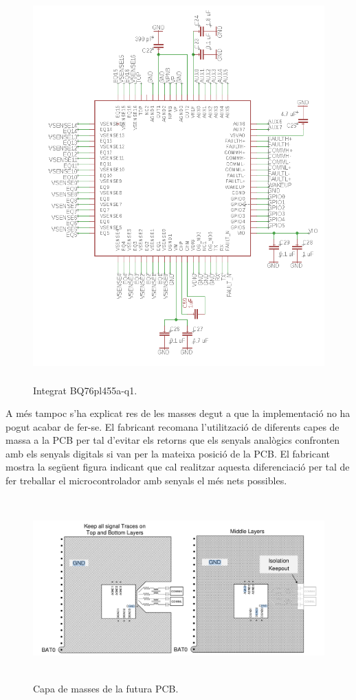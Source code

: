 \begin{figure}[H]
	\centering
    \includegraphics[width=\textwidth, height=15cm] {Prototip/schbq.png}
    \caption{Integrat BQ76pl455a-q1.}
\end{figure}

\newpage 

A més tampoc s'ha explicat res de les masses degut a que la implementació no ha pogut acabar de fer-se. El fabricant recomana l'utilització de diferents capes de massa a la PCB per tal d'evitar els retorns que els senyals analògics confronten amb els senyals digitals si van per la mateixa posició de la PCB. El fabricant mostra la següent figura indicant que cal realitzar aquesta diferenciació per tal de fer treballar el microcontrolador amb senyals el més nets possibles.

\begin{figure}[H]
	\centering
    \includegraphics[width=\textwidth, height=7cm] {Prototip/pcbgnd.png}
    \caption{Capa de masses de la futura PCB.}
\end{figure}

